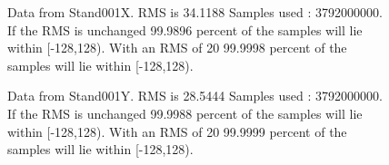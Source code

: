 \begin{figure}[ht] 				 				 				\caption{Data from Stand001X. RMS is 34.1188 Samples used : 3792000000. If the RMS is unchanged 99.9896 percent of the samples will lie within [-128,128).  				 With an RMS of 20 99.9998 percent of the samples will lie within [-128,128).} 				\end{figure} 

\begin{figure}[ht] 				 				 				\caption{Data from Stand001Y. RMS is 28.5444 Samples used : 3792000000. If the RMS is unchanged 99.9988 percent of the samples will lie within [-128,128).  				 With an RMS of 20 99.9999 percent of the samples will lie within [-128,128).} 				\end{figure} 

